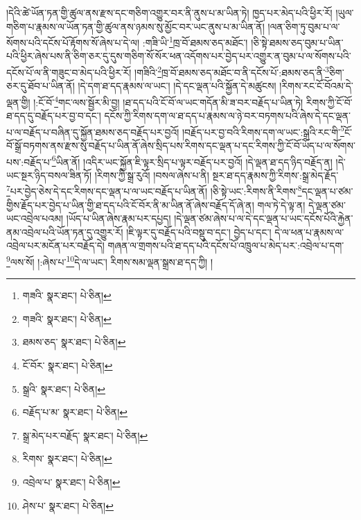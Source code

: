 །དེའི་ཚེ་ཡོན་ཏན་གྱི་ཚུལ་ནས་རྫས་དང་གཅིག་འགྱུར་བར་ནི་ནུས་པ་མ་ཡིན་ཏེ། ཁྱད་པར་མེད་པའི་ཕྱིར་རོ། །ཡུལ་གཅིག་པ་རྣམས་ལ་ཡོན་ཏན་གྱི་ཚུལ་ནས་ཉམས་སུ་མྱོང་བར་ཡང་ནུས་པ་མ་ཡིན་ནོ། །ལན་ཅིག་ཏུ་བུམ་པ་ལ་སོགས་པའི་དངོས་པོ་རྟོགས་སོ་ཞེས་པ་དེ་ལ། :གཟི་ཡི་\footnote{གཟའི་  སྣར་ཐང་།  པེ་ཅིན། }ཁྲ་བོ་ཐམས་ཅད་མཐོང་། །ཅི་སྟེ་ཐམས་ཅད་བུམ་པ་ཡིན་པའི་ཕྱིར་ཞེས་པས་ནི་ཅིག་ཅར་དུ་དུས་གཅིག་སོ་སོར་ཕན་འདོགས་པར་བྱེད་པར་འགྱུར་ན་བུམ་པ་ལ་སོགས་པའི་དངོས་པོ་ལ་ནི་གཟུང་བ་མེད་པའི་ཕྱིར་རོ། །གཟིའི་\footnote{གཟའི་  སྣར་ཐང་།  པེ་ཅིན། }ཁྲ་བོ་ཐམས་ཅད་མཐོང་བ་ནི་དངོས་པོ་:ཐམས་ཅད་ནི་\footnote{ཐམས་ཅད་  སྣར་ཐང་།  པེ་ཅིན། }ཅིག་ཅར་དུ་ཐོབ་པ་ཡིན་ནོ། །དེ་དག་ཐ་དད་རྣམས་ལ་ཡང་། །དེ་དང་ལྡན་པའི་སྐྱོན་དེ་མཚུངས། །རིགས་རང་ངོ་བོའམ་དེ་ལྡན་གྱི། །:ངོ་བོ་\footnote{ངོ་བོར་  སྣར་ཐང་།  པེ་ཅིན། }གང་ལས་སྦྱོར་མི་བྱ། །ཐ་དད་པའི་ངོ་བོ་ལ་ཡང་གདོན་མི་ཟ་བར་བརྗོད་པ་ཡིན་ཏེ། རིགས་ཀྱི་ངོ་བོ་ཐ་དད་དུ་བརྗོད་པར་བྱ་བ་དང་། དངོས་ཀྱི་རིགས་དག་ལ་ཐ་དད་པ་རྣམས་ལ་ཉེ་བར་བཏགས་པའི་ཞེས་དེ་དང་ལྡན་པ་ལ་བརྗོད་པ་བཞིན་དུ་སྐྱོན་ཐམས་ཅད་བརྗོད་པར་བྱའོ། །བརྗོད་པར་བྱ་བའི་རིགས་དག་ལ་ཡང་:སྒྲའི་རང་གི་\footnote{སྒྲའི་  སྣར་ཐང་།  པེ་ཅིན། }ངོ་བོ་སྒྲོ་བཏགས་ནས་རྫས་སུ་བརྗོད་པ་ཡིན་ནོ་ཞེས་སྲིད་པས་རིགས་དང་ལྡན་པ་དང་རིགས་ཀྱི་ངོ་བོ་ཡོད་པ་ལ་སོགས་པས་:བརྗོད་པ་\footnote{བརྗོད་པ་མ་  སྣར་ཐང་།  པེ་ཅིན། }ཡིན་ནོ། །འདིར་ཡང་སྐྱོན་ཇི་ལྟར་སྲིད་པ་ལྟར་བརྗོད་པར་བྱའོ། །དེ་ལྡན་ཐ་དད་ཉིད་བརྗོད་ན། །དེ་ཡང་སྔར་ཉིད་བསལ་ཟིན་ཏོ། །རིགས་ཀྱི་སྒྲ་རུའོ། །བསལ་ཞེས་པ་ནི། སྔར་ཐ་དད་རྣམས་ཀྱི་རིགས་:སྒྲ་མེད་རྗོད་\footnote{སྒྲ་མེད་པར་བརྗོད་  སྣར་ཐང་།  པེ་ཅིན། }པར་བྱེད་ཅེས་དེ་དང་རིགས་དང་ལྡན་པ་ལ་ཡང་བརྗོད་པ་ཡིན་ནོ། །ཅི་སྟེ་ཡང་:རིགས་ནི་རིགས་\footnote{རིགས་  སྣར་ཐང་།  པེ་ཅིན། }དང་ལྡན་པ་ཙམ་གྱིས་རྗོད་པར་བྱེད་པ་ཡིན་གྱི་ཐ་དད་པའི་ངོ་བོར་ནི་མ་ཡིན་ནོ་ཞེས་བརྗོད་དོ་ཞེ་ན། གལ་ཏེ་དེ་ལྟ་ན། དེ་ལྡན་ཙམ་ཡང་འབྲེལ་པའམ། །ཡོད་པ་ཡིན་ཞེས་རྣམ་པར་དཔྱད། །དེ་ལྡན་ཙམ་ཞེས་པ་ལ་དེ་དང་ལྡན་པ་ཡང་དངོས་པོའི་རྐྱེན་ནམ་འབྲེལ་པའི་ཡོན་ཏན་དུ་འགྱུར་རོ། །ཇི་ལྟར་དུ་བརྗོད་པའི་བསྡུ་བ་དང་། བྱེད་པ་དང་། དེ་ལ་ཕན་པ་རྣམས་ལ་འབྲེལ་པར་མངོན་པར་བརྗོད་དེ། གཞན་ལ་གྲགས་པའི་ཐ་དད་པའི་དངོས་པོ་འཁྲུལ་པ་མེད་པར་:འབྲེལ་པ་དག་\footnote{འབྲེལ་པ་  སྣར་ཐང་།  པེ་ཅིན། }ལས་སོ། །:ཞེས་པ་\footnote{ཤེས་པ་  སྣར་ཐང་།  པེ་ཅིན། }དེ་ལ་ཡང་། རིགས་སམ་ལྡན་སྒྲས་ཐ་དད་ཀྱི། །
